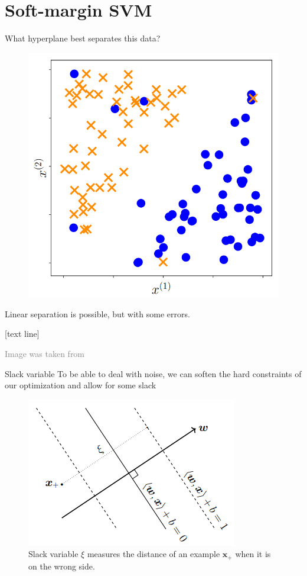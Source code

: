 \documentclass[dvipsnames]{beamer}
\newcommand{\referencefootnote}[1]{\setbeamertemplate{footline}[text line]{%
\parbox{0.9\paperwidth}{\vspace*{-23pt}\tiny{\textcolor{gray}{#1}}\hfill\scriptsize\insertframenumber}}}
\begin{document}
		\section{Soft-margin SVM}
			\begin{frame}{What hyperplane best separates this data?}
			  \begin{figure}
					\center
					\includegraphics[scale=.25]{figures/binary3.png}
        \end{figure} %
				Linear separation is possible, but with some errors.
			\end{frame}

{ \referencefootnote{Image was taken from \cite{deisenroth_faisal_ong_2020}}
			\begin{frame}{Slack variable}
			To be able to deal with noise, we can soften the hard constraints of our optimization and allow for some slack
			  \begin{figure}
					\center
					\includegraphics[scale=.45]{figures/slack.png}
           \caption{Slack variable $\xi$ measures the distance of an example $\mathbf{x}_+$ when it is on the wrong side.}
        \end{figure}
			\end{frame}
			}
			
\end{document}
